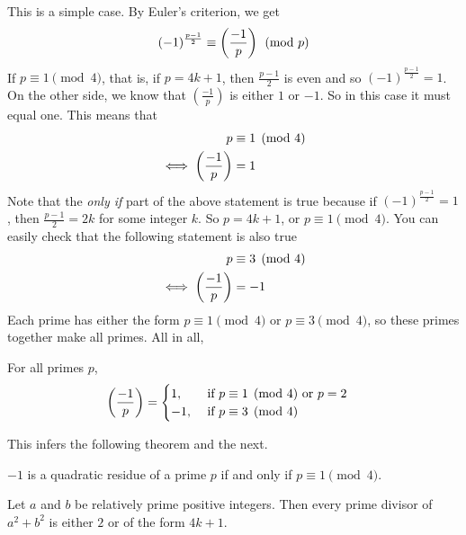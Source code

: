 \begin{solution}
	This is a simple case. By Euler's criterion, we get
	\begin{align*}
		(-1)^{\frac{p-1}{2}} \equiv \left(\dfrac{-1}{p}\right) \pmod p
	\end{align*}
	If $p \equiv 1 \pmod 4$, that is, if $p=4k+1$, then $\frac{p-1}{2}$ is even and so $(-1)^{\frac{p-1}{2}} =1$. On the other side, we know that $\left(\frac{-1}{p}\right)$ is either $1$ or $-1$. So in this case it must equal one. This means that
	\begin{align*}
		p
			& \equiv 1 \pmod 4\\
		\iff \left(\dfrac{-1}{p}\right)
			& =1
	\end{align*}
	Note that the \textit{only if} part of the above statement is true because if $(-1)^{\frac{p-1}{2}}=1$, then $\frac{p-1}{2} = 2k$ for some integer $k$. So $p=4k+1$, or $p \equiv 1 \pmod 4$. You can easily check that the following statement is also true
	\begin{align*}
		p
			& \equiv 3 \pmod 4\\
		\iff \left(\dfrac{-1}{p}\right)
			& =-1
	\end{align*}
	Each prime has either the form $p \equiv 1 \pmod 4$ or $p \equiv 3 \pmod 4$, so these primes together make all primes. All in all,
\end{solution}

\begin{theorem}\label{thm:-1qr} For all primes $p$,
	\begin{align*}
	\left(\dfrac{-1}{p}\right)
	& =
	\begin{cases}
	1,&\mbox{ if } p \equiv 1 \pmod 4\text{ or }p=2\\
	-1, &\mbox{ if } p \equiv 3 \pmod 4
	\end{cases}
	\end{align*}
\end{theorem}
This infers the following theorem and the next.
\begin{theorem}
	$-1$ is a quadratic residue of a prime $p$ if and only if $p\equiv1\pmod4$.
\end{theorem}

\begin{theorem} \label{thm:a^2+b^2}
	Let $a$ and $b$ be relatively prime positive integers. Then every prime divisor of $a^2+b^2$ is either $2$ or of the form $4k+1$.
\end{theorem}

